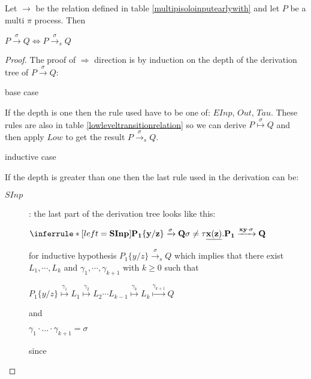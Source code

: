 \begin{proposition}
  Let $\rightarrow$ be the relation defined in table \ref{multipisoloinputearlywith} and let $P$ be a multi $\pi$ process. Then 
  \begin{center}
    $P\xrightarrow{\sigma} Q \Leftrightarrow P\xrightarrow{\sigma}_{s} Q$
  \end{center}
  \begin{proof}
    The proof of $\Rightarrow$ direction is by induction on the depth of the derivation tree of $P\xrightarrow{\sigma} Q$:
    \begin{description}
      \item[base case]
    \end{description}
	If the depth is one then the rule used have to be one of: $EInp$, $Out$, $Tau$. These rules are also in table \ref{lowleveltransitionrelation} so we can derive $P \stackrel{\sigma}{\longmapsto} Q$ and then apply $Low$ to get the result $P\xrightarrow{\sigma}_{s} Q$.
    \begin{description}
      \item[inductive case]
    \end{description}
	If the depth is greater than one then the last rule used in the derivation can be:
	\begin{description}
	  \item[$SInp$]: 
	    the last part of the derivation tree looks like this:
	    \begin{center}
	      $\inferrule* [left=\bf{SInp}]{
		  P_{1}\{y/z\} \xrightarrow{\sigma} Q
		\\
		  \sigma\neq \tau
	      }{
		\underline{x(z)}.P_{1} \xrightarrow{xy \cdot \sigma} Q
	      }$	      
	    \end{center}
	    for inductive hypothesis $P_{1}\{y/z\} \xrightarrow{\sigma}_{s} Q$ which implies that there exist $L_{1}, \cdots, L_{k}$ and $\gamma_{1}, \cdots, \gamma_{k+1}$ with $k\geq 0$ such that 
	    \begin{center}
	      $P_{1}\{y/z\} \stackrel{\gamma_{1}}{\longmapsto} L_{1}  \stackrel{\gamma_{2}}{\longmapsto} L_{2} \cdots L_{k-1} \stackrel{\gamma_{k}}{\longmapsto} L_{k} \stackrel{\gamma_{k+1}}{\longmapsto} Q$ 
	    \end{center}
	    and 
	    \begin{center}
	      $\gamma_{1} \cdot \ldots \cdot \gamma_{k+1} =  \sigma$
	    \end{center}
	    since
	    \begin{center}

\end{center}
\end{description}
\end{proof}
\end{proposition}
